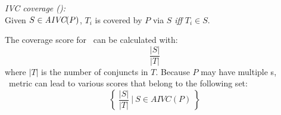 


\begin{definition} {\emph{IVC coverage (\ivccov):}} \\
\label{def:coverage-justi}
Given $S \in \textit{AIVC}(P)$, $T_i$ is covered by $P$ via $S$ \emph{iff} $T_i \in S$.
\end{definition}

The coverage score for \ivccov\ can be calculated with: $$\frac{|S|}{|T|}$$  where $|T|$ is the number of conjuncts in $T$.
Because $P$ may have multiple \mivc s,
  \ivccov\ metric can lead to various scores that belong to the following set:
\[
\left\{~\frac{ |S|}{|T|}~\bigg|~S \in AIVC(P)~\right\}
\]

